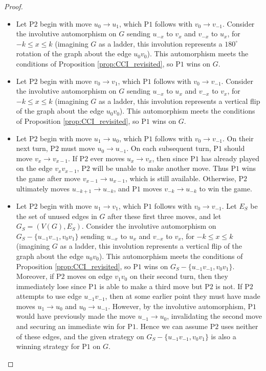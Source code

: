 \documentclass{article}
\theoremstyle{plain}
\theoremstyle{definition}
\def\pone{{\rm{P}\ensuremath{1}}}
\def\ptwo{{\rm{P}\ensuremath{2}}}
\begin{document}
\begin{proof}
\begin{itemize}
\item [(ii)] Let \ptwo{} begin with move $u_0 \to u_{1}$, which \pone{} follows with $v_0 \to v_{-1}$. Consider the involutive automorphism on $G$ sending $u_{-x}$ to $v_{x}$ and $v_{-x}$ to $u_{x}$, for $-k \le x \le k$ (imagining $G$ as a ladder, this involution represents a $180^\circ$ rotation of the graph about the edge $u_0v_0$). This automorphism meets the conditions of Proposition \ref{prop:CCI_revisited}, so \pone{} wins on $G$. 

\item [(iii)] Let \ptwo{} begin with move $v_{0} \to v_{1}$, which \pone{} follows with $v_0 \to v_{-1}$. Consider the involutive automorphism on $G$ sending $u_{-x}$ to $u_{x}$ and $v_{-x}$ to $v_{x}$, for $-k \le x \le k$ (imagining $G$ as a ladder, this involution represents a vertical flip of the graph about the edge $u_0v_0$). This automorphism meets the conditions of Proposition \ref{prop:CCI_revisited}, so \pone{} wins on $G$. 

\item [(iv)] Let \ptwo{} begin with move $u_{1} \to u_0$, which \pone{} follows with $v_0 \to v_{-1}$. On their next turn, \ptwo{} must move $u_0 \to u_{-1}$. On each subsequent turn, \pone{} should move $v_{x} \to v_{x-1}$. If \ptwo{} ever moves $u_{x} \to v_{x}$, then since \pone{} has already played on the edge $v_{x} v_{x-1}$, \ptwo{} will be unable to make another move. Thus \pone{} wins the game after move $v_{x-1}\to u_{x-1}$, which is still available. Otherwise, \ptwo{} ultimately moves $u_{-k+1} \to u_{-k}$, and \pone{} moves $v_{-k} \to u_{-k}$ to win the game. 

\item [(v)] Let \ptwo{} begin with move $u_{1} \to v_{1}$, which \pone{} follows with $v_0 \to v_{-1}$. Let $E_S$ be the set of unused edges in $G$ after these first three moves, and let $G_S = (V(G), E_S)$. Consider the involutive automorphism on $G_S-\{u_{-1}v_{-1},v_0v_1\}$ sending $u_{-x}$ to $u_{x}$ and $v_{-x}$ to $v_{x}$, for $-k \le x \le k$ (imagining $G$ as a ladder, this involution represents a vertical flip of the graph about the edge $u_0v_0$). This automorphism meets the conditions of Proposition \ref{prop:CCI_revisited}, so \pone{} wins on $G_S-\{u_{-1}v_{-1},v_0v_1\}$. Moreover, if \ptwo{} moves on edge $v_1 v_0$ on their second turn, then they immediately lose since \pone{} is able to make a third move but \ptwo{} is not. If \ptwo{} attempts to use edge $u_{-1}v_{-1}$, then at some earlier point they must have made moves $u_1 \to u_0$ and $u_0 \to u_{-1}$. However, by the involutive automorphism, \pone{} would have previously made the move $u_{-1} \to u_0$, invalidating the second move and securing an immediate win for \pone{}. Hence we can assume \ptwo{} uses neither of these edges, and the given strategy on $G_S-\{u_{-1}v_{-1},v_0v_1\}$ is also a winning strategy for \pone{} on $G$. 


\end{itemize}
\end{proof}
\end{document}
